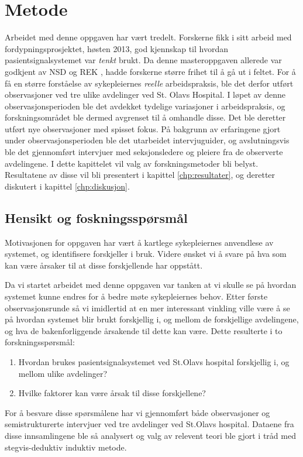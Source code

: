 \chapter{Metode}
\label{chp:metode} 

Arbeidet med denne oppgaven har vært tredelt. Forskerne fikk i sitt arbeid med fordypningsprosjektet, høsten 2013, god kjennskap til hvordan pasientsignalsystemet var \textit{tenkt} brukt. Da denne masteroppgaven allerede var godkjent av NSD \citep{NSD} og REK \citep{REK}, hadde forskerne større frihet til å gå ut i feltet. For å få en større forståelse av sykepleiernes \textit{reelle} arbeidspraksis, ble det derfor utført observasjoner ved tre ulike avdelinger ved St. Olavs Hospital. I løpet av denne observasjonsperioden ble det avdekket tydelige variasjoner i arbeidspraksis, og forskningsområdet ble dermed avgrenset til å omhandle disse. Det ble deretter utført nye observasjoner med spisset fokus. På bakgrunn av erfaringene gjort under observasjonsperioden ble det utarbeidet intervjuguider, og avslutningsvis ble det gjennomført intervjuer med seksjonsledere og pleiere fra de observerte avdelingene. I dette kapittelet vil valg av forskningsmetoder bli belyst. Resultatene av disse vil bli presentert i kapittel \ref{chp:resultater}, og deretter diskutert i kapittel \ref{chp:diskusjon}.


\section{Hensikt og foskningsspørsmål}
Motivasjonen for oppgaven har vært å kartlege sykepleiernes anvendlese av systemet, og identifisere forskjeller i bruk. Videre ønsket vi å svare på hva som kan være årsaker til at disse forskjellende har oppstått. 

\noindent
Da vi startet arbeidet med denne oppgaven var tanken at vi skulle se på hvordan systemet kunne endres for å bedre møte sykepleiernes behov. Etter første observasjonsrunde så vi imidlertid at en mer interessant vinkling ville være å se på hvordan systemet blir brukt forskjellig i, og mellom de forskjellige avdelingene, og hva de bakenforliggende årsakende til dette kan være. Dette resulterte i to forskningsspørsmål:

\begin{enumerate}
\item Hvordan brukes pasientsignalsystemet ved St.Olavs hospital forskjellig i, og mellom ulike avdelinger? 
\item Hvilke faktorer kan være årsak til disse forskjellene?
\end{enumerate}

\noindent
For å besvare disse spørsmålene har vi gjennomført både observasjoner og semistrukturerte intervjuer ved tre avdelinger ved St.Olavs hospital. Dataene fra disse innsamlingene ble så analysert og valg av relevent teori ble gjort i tråd med stegvis-deduktiv induktiv metode.
